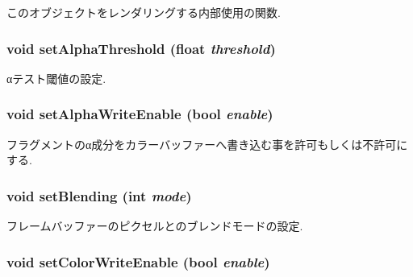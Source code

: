 このオブジェクトをレンダリングする内部使用の関数. \hypertarget{classm3g_1_1CompositingMode_6becafaefd18a2b8b1adeba491576837}{
\subsubsection[{setAlphaThreshold}]{\setlength{\rightskip}{0pt plus 5cm}void setAlphaThreshold (float {\em threshold})}}
\label{classm3g_1_1CompositingMode_6becafaefd18a2b8b1adeba491576837}


αテスト閾値の設定. \hypertarget{classm3g_1_1CompositingMode_5204f1acac056f82d322262703be67b0}{
\subsubsection[{setAlphaWriteEnable}]{\setlength{\rightskip}{0pt plus 5cm}void setAlphaWriteEnable (bool {\em enable})}}
\label{classm3g_1_1CompositingMode_5204f1acac056f82d322262703be67b0}


フラグメントのα成分をカラーバッファーへ書き込む事を許可もしくは不許可にする. \hypertarget{classm3g_1_1CompositingMode_4c09465dfec9efa000c115c5c2867b63}{
\subsubsection[{setBlending}]{\setlength{\rightskip}{0pt plus 5cm}void setBlending (int {\em mode})}}
\label{classm3g_1_1CompositingMode_4c09465dfec9efa000c115c5c2867b63}


フレームバッファーのピクセルとのブレンドモードの設定. \hypertarget{classm3g_1_1CompositingMode_84f7cba08f5a2bea05de4fc3154a50b2}{
\subsubsection[{setColorWriteEnable}]{\setlength{\rightskip}{0pt plus 5cm}void setColorWriteEnable (bool {\em enable})}}
\label{classm3g_1_1CompositingMode_84f7cba08f5a2bea05de4fc3154a50b2}


